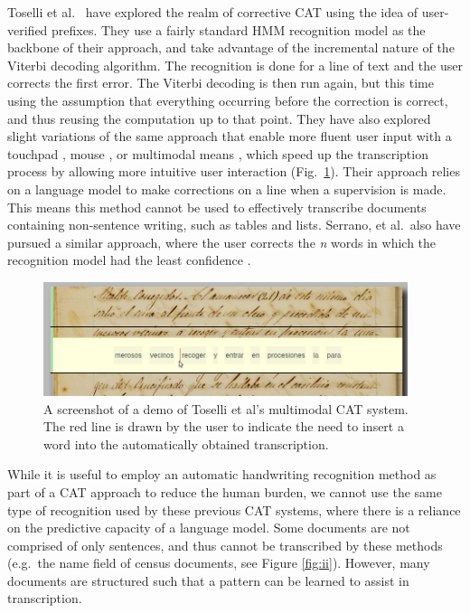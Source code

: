 \documentclass[ms,electronic,twosidetoc,letterpaper,chaptercenter,parttop,lof,lot]{byumsphd}
\begin{document}
Toselli et al.~\cite{Toselli2007} have explored the realm of corrective CAT using the idea of user-verified prefixes. They use a fairly standard HMM recognition model as the backbone of their approach, and take advantage of the incremental nature of the Viterbi decoding algorithm. The recognition is done for a line of text and the user corrects the first error. The Viterbi decoding is then run again, but this time using the assumption that everything occurring before the correction is correct, and thus reusing the computation up to that point. They have also explored slight variations of the same approach that enable more fluent user input with a touchpad \cite{Toselli2008}, mouse \cite{Toselli2009}, or multimodal means \cite{Toselli2010}, which speed up the transcription process by allowing more intuitive user interaction (Fig.~\ref{fig:Toselli_multimodalCAT}). Their approach relies on a language model to make corrections on a line when a supervision is made. This means this method cannot be used to effectively transcribe documents containing non-sentence writing, such as tables and lists. Serrano, et al.~also have pursued a similar approach, where the user corrects the \textit{n} words in which the recognition model had the least confidence \cite{Serrano2014}.

\begin{figure}
    \centering
    \includegraphics[width=0.95\textwidth]{Toselli_multimodalCAT}
    \caption{A screenshot of a demo of Toselli et al's multimodal CAT system. The red line is drawn by the user to indicate the need to insert a word into the automatically obtained transcription.}
    \label{fig:Toselli_multimodalCAT}
\end{figure}

While it is useful to employ an automatic handwriting recognition method as part of a CAT approach to reduce the human burden, we cannot use the same type of recognition used by these previous CAT systems, where there is a reliance on the predictive capacity of a language model. Some documents are not comprised of only sentences, and thus cannot be transcribed by these methods (e.g.~the name field of census documents, see Figure \ref{fig:ii}). However, many documents are structured such that a pattern can be learned to assist in transcription.
\end{document}
